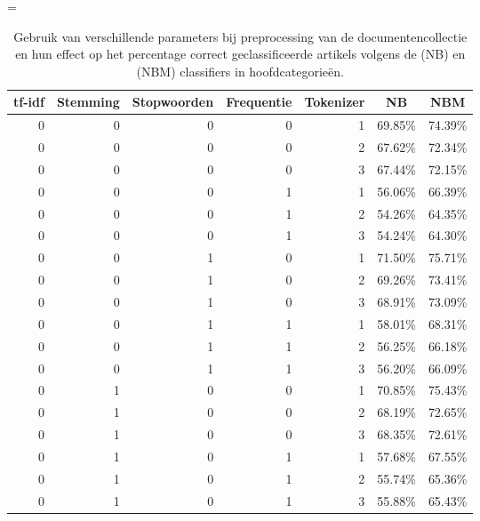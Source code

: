 \LTcapwidth=\textwidth
\begin{longtable}{rrrrrrr}
	\caption{Gebruik van verschillende parameters bij preprocessing van de documentencollectie  en hun effect op het percentage correct geclassificeerde artikels volgens de  (NB) en  (NBM) classifiers in hoofdcategorie\"en.}\\
	\toprule
	\multicolumn{1}{c}{\textbf{tf-idf}} & \multicolumn{1}{c}{\textbf{Stemming}} & \multicolumn{1}{c}{\textbf{Stopwoorden}} & \multicolumn{1}{c}{\textbf{Frequentie}} & \multicolumn{1}{c}{\textbf{Tokenizer}} & \multicolumn{1}{c}{\textbf{NB}} & \multicolumn{1}{c}{\textbf{NBM}} \\
	\midrule
	0     & 0     & 0     & 0     & 1     & 69.85\% & 74.39\% \\
	0     & 0     & 0     & 0     & 2     & 67.62\% & 72.34\% \\
	0     & 0     & 0     & 0     & 3     & 67.44\% & 72.15\% \\
	0     & 0     & 0     & 1     & 1     & 56.06\% & 66.39\% \\
	0     & 0     & 0     & 1     & 2     & 54.26\% & 64.35\% \\
	0     & 0     & 0     & 1     & 3     & 54.24\% & 64.30\% \\
	0     & 0     & 1     & 0     & 1     & 71.50\% & 75.71\% \\
	0     & 0     & 1     & 0     & 2     & 69.26\% & 73.41\% \\
	0     & 0     & 1     & 0     & 3     & 68.91\% & 73.09\% \\
	0     & 0     & 1     & 1     & 1     & 58.01\% & 68.31\% \\
	0     & 0     & 1     & 1     & 2     & 56.25\% & 66.18\% \\
	0     & 0     & 1     & 1     & 3     & 56.20\% & 66.09\% \\
	0     & 1     & 0     & 0     & 1     & 70.85\% & 75.43\% \\
	0     & 1     & 0     & 0     & 2     & 68.19\% & 72.65\% \\
	0     & 1     & 0     & 0     & 3     & 68.35\% & 72.61\% \\
	0     & 1     & 0     & 1     & 1     & 57.68\% & 67.55\% \\
	0     & 1     & 0     & 1     & 2     & 55.74\% & 65.36\% \\
	0     & 1     & 0     & 1     & 3     & 55.88\% & 65.43\% \\

\end{longtable}
